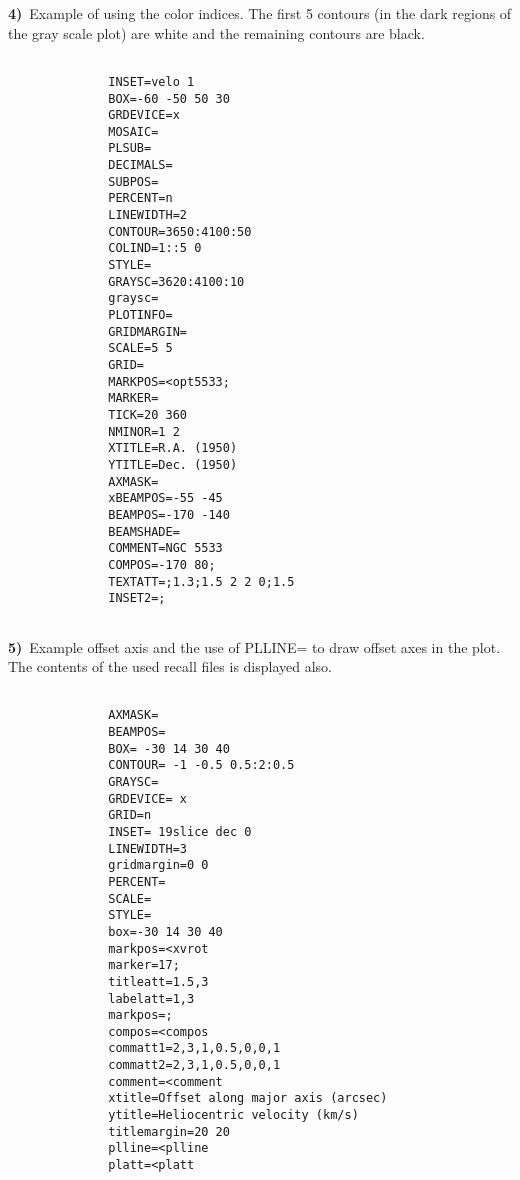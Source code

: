               
              {\bf 4)}\  Example of using the color indices. The first 5 contours
                 (in the dark regions of the gray scale plot) are white
                 and the remaining contours are black.
              
\begin{verbatim}

              INSET=velo 1
              BOX=-60 -50 50 30
              GRDEVICE=x
              MOSAIC=
              PLSUB=
              DECIMALS=
              SUBPOS=
              PERCENT=n
              LINEWIDTH=2
              CONTOUR=3650:4100:50
              COLIND=1::5 0
              STYLE=
              GRAYSC=3620:4100:10
              graysc=
              PLOTINFO=
              GRIDMARGIN=
              SCALE=5 5
              GRID=
              MARKPOS=<opt5533;
              MARKER=
              TICK=20 360
              NMINOR=1 2
              XTITLE=R.A. (1950)
              YTITLE=Dec. (1950)
              AXMASK=
              xBEAMPOS=-55 -45
              BEAMPOS=-170 -140
              BEAMSHADE=
              COMMENT=NGC 5533
              COMPOS=-170 80;
              TEXTATT=;1.3;1.5 2 2 0;1.5
              INSET2=;
      
\end{verbatim}
                     
              {\bf 5)}\ Example offset axis and the use of PLLINE= to draw
                 offset axes in the plot. The contents of the used 
                 recall files is displayed also.

\begin{verbatim}

              AXMASK= 
              BEAMPOS=
              BOX= -30 14 30 40
              CONTOUR= -1 -0.5 0.5:2:0.5
              GRAYSC=
              GRDEVICE= x
              GRID=n
              INSET= 19slice dec 0
              LINEWIDTH=3
              gridmargin=0 0
              PERCENT=
              SCALE= 
              STYLE=
              box=-30 14 30 40
              markpos=<xvrot
              marker=17;
              titleatt=1.5,3
              labelatt=1,3
              markpos=;
              compos=<compos
              commatt1=2,3,1,0.5,0,0,1
              commatt2=2,3,1,0.5,0,0,1
              comment=<comment
              xtitle=Offset along major axis (arcsec)
              ytitle=Heliocentric velocity (km/s)
              titlemargin=20 20
              plline=<plline
              platt=<platt
              
      
\end{verbatim}
        
